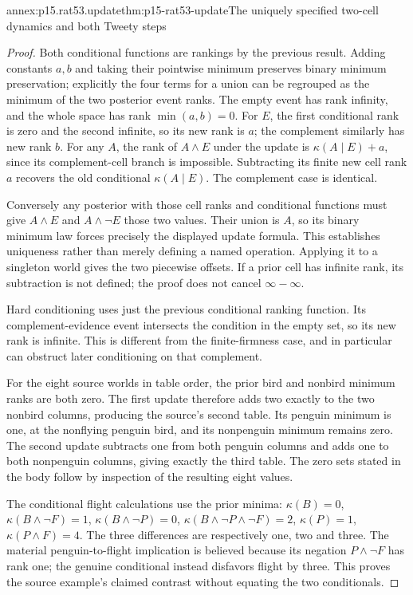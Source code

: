 \begin{annexitem}{annex:p15.rat53.update}{thm:p15-rat53-update}{The uniquely specified two-cell dynamics and both Tweety steps}
\begin{proof}
Both conditional functions are rankings by the previous result.
Adding constants \(a,b\) and taking their pointwise minimum preserves
binary minimum preservation; explicitly the four terms for a union can be
regrouped as the minimum of the two posterior event ranks.
The empty event has rank infinity, and the whole space has rank
\(\min(a,b)=0\).  For \(E\), the first conditional rank is zero and
the second infinite, so its new rank is \(a\); the complement similarly
has new rank \(b\).
For any \(A\), the rank of \(A\land E\) under the update is
\(\kappa(A\mid E)+a\), since its complement-cell branch is impossible.
Subtracting its finite new cell rank \(a\) recovers the old conditional
\(\kappa(A\mid E)\).  The complement case is identical.

Conversely any posterior with those cell ranks and conditional functions
must give \(A\land E\) and \(A\land\neg E\) those two values.
Their union is \(A\), so its binary minimum law forces precisely the
displayed update formula.  This establishes uniqueness rather than merely
defining a named operation.  Applying it to a singleton world gives the
two piecewise offsets.  If a prior cell has infinite rank, its subtraction
is not defined; the proof does not cancel \(\infty-\infty\).

Hard conditioning uses just the previous conditional ranking function.
Its complement-evidence event intersects the condition in the empty set,
so its new rank is infinite.  This is different from the finite-firmness
case, and in particular can obstruct later conditioning on that complement.

For the eight source worlds in table order, the prior bird and nonbird
minimum ranks are both zero.  The first update therefore adds two exactly
to the two nonbird columns, producing the source's second table.
Its penguin minimum is one, at the nonflying penguin bird, and its
nonpenguin minimum remains zero.  The second update subtracts one from
both penguin columns and adds one to both nonpenguin columns, giving
exactly the third table.  The zero sets stated in the body follow by
inspection of the resulting eight values.

The conditional flight calculations use the prior minima:
\(\kappa(B)=0\), \(\kappa(B\land\neg F)=1\),
\(\kappa(B\land\neg P)=0\),
\(\kappa(B\land\neg P\land\neg F)=2\),
\(\kappa(P)=1\), \(\kappa(P\land F)=4\).
The three differences are respectively one, two and three.
The material penguin-to-flight implication is believed because its
negation \(P\land\neg F\) has rank one; the genuine conditional
instead disfavors flight by three.  This proves the source example's
claimed contrast without equating the two conditionals.
\end{proof}
\end{annexitem}

